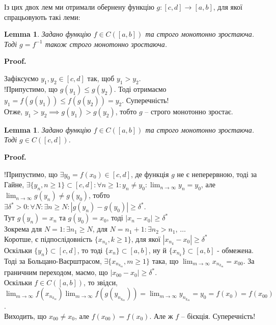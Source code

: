 \documentclass[a4paper, 14pt]{article}
\makeatletter
\def\qed{$\blacksquare$}
\theoremstyle{theoremdd}
\theoremstyle{theoremdd}
\theoremstyle{theoremdd}
\theoremstyle{theoremdd}
\theoremstyle{theoremdd}
\theoremstyle{theoremdd}
\theoremstyle{theoremdd}
\newtheorem{lemma}[theorem]{Lemma}
\theoremstyle{theoremdd}
\renewenvironment{proof}[1][Proof.\\]{\par
\pushQED{\hfill \qed}%
\normalfont \topsep6\p@\@plus6\p@\relax
\trivlist
\item\relax
{\bfseries
#1\@addpunct{.}}\hspace\labelsep\ignorespaces
}{%
\popQED\endtrivlist\@endpefalse
}
\makeatother
\begin{document}
Із цих двох лем ми отримали обернену функцію $g: [c,d] \to [a,b]$, для якої спрацьовують такі леми:

\begin{lemma}
Задано функцію $f \in C([a,b])$ та строго монотонно зростаюча. Тоді $g = f^{-1}$ також строго монотонно зростаюча.
\end{lemma}

\begin{proof}
Зафіксуємо $y_1,y_2 \in [c,d]$ так, щоб $y_1 > y_2$.\\
!Припустимо, що $g(y_1) \leq g(y_2)$. Тоді отримаємо $y_1 = f(g(y_1)) \leq f(g(y_2)) = y_2$. Суперечність!\\
Отже, $y_1 > y_2 \implies g(y_1) > g(y_2)$, тобто $g$ -- строго монотонно зростає.
\end{proof}

\begin{lemma}
Задано функцію $f \in C([a,b])$ та строго монотонно зростаюча. Тоді $g \in C([c,d])$.
\end{lemma}

\begin{proof}
!Припустимо, що $\exists y_0 = f(x_0) \in [c,d]$, де функція $g$ не є неперервною, тоді за Гайне, $\exists \{y_n, n \geq 1\} \subset [c,d]: \forall n \geq 1: y_n \neq y_0: \displaystyle\lim_{n \to \infty} y_n = y_0$, але $\displaystyle\lim_{n \to \infty} g(y_n) \neq g(y_0)$, тобто\\
$\exists \delta^* > 0: \forall N: \exists n \geq N: |g(y_n)-g(y_0)| \geq \delta^*$.\\
Тут $g(y_n) = x_n$ та $g(y_0) = x_0$, тоді $|x_n-x_0| \geq \delta^*$\\
Зокрема для $N = 1: \exists n_1 \geq N$, для $N = n_1+1: \exists n_2 > n_1$, $\dots$\\
Коротше, є підпослідовність $\{x_{n_k}, k \geq 1\}$, для якої $|x_{n_k} -x_0| \geq \delta^*$\\
Оскільки $\{y_n\} \subset [c,d]$, то тоді $\{x_n \} \subset [a,b]$, ну й $\{x_{n_k}\} \subset [a,b]$ - обмежена. Тоді за Больцано-Ваєрштрасом, $\exists \{x_{n_{k_m}}, m \geq 1\}$ така, що $\displaystyle\lim_{m \to \infty} x_{n_{k_m}} = x_{00}$. За граничним переходом, маємо, що $|x_{00}-x_0| \geq \delta^*$.\\
Оскільки $f \in C([a,b])$, то звідси, $\displaystyle\lim_{m \to \infty} f(x_{n_{k_m}}) \lim_{m \to \infty} f(g(y_{n_{k_m}})) = \lim_{m \to \infty} y_{n_{k_m}} = y_0 = f(x_0) = f(x_{00})$.\\
Виходить, що $x_{00} \neq x_0$, але $f(x_{00}) = f(x_0)$. Але ж $f$ -- бієкція. Суперечність!
\end{proof}
\end{document}
